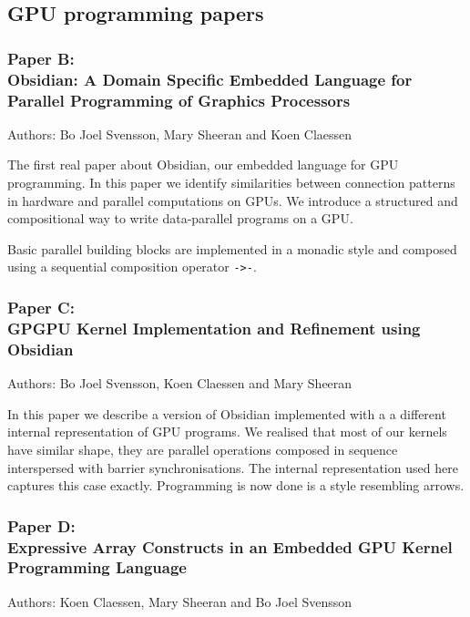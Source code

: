 \documentclass[a4paper]{book}
\newcommand{\paperB}{Paper B}
\newcommand{\paperBTitle}{Obsidian: A Domain Specific Embedded Language for Parallel Programming of Graphics Processors}
\newcommand{\paperC}{Paper C}
\newcommand{\paperCTitle}{GPGPU Kernel Implementation and Refinement using Obsidian}
\newcommand{\paperD}{Paper D}
\newcommand{\paperDTitle}{Expressive Array Constructs in an Embedded GPU Kernel Programming Language}
\begin{document}
\subsection{GPU programming papers} 

\subsubsection{\paperB: \\ \paperBTitle}

Authors: Bo Joel Svensson, Mary Sheeran and Koen Claessen \newline

\vspace{5mm}

The first real paper about Obsidian, our embedded language for GPU 
programming. In this paper we identify similarities between 
connection patterns in hardware and parallel computations on GPUs. 
We introduce a structured and compositional way to write data-parallel 
programs on a GPU.

Basic parallel building blocks are implemented in a monadic style and 
composed using a sequential composition operator {\tt ->-}. 

\subsubsection{\paperC: \\ \paperCTitle}

Authors: Bo Joel Svensson, Koen Claessen and Mary Sheeran \newline

\vspace{5mm}

In this paper we describe a version of Obsidian implemented with a 
a different internal representation of GPU programs. We realised that 
most of our kernels have similar shape, they are parallel operations 
composed in sequence interspersed with barrier synchronisations. The 
internal representation used here captures this case exactly. Programming 
is now done is a style resembling arrows. 


\subsubsection{\paperD: \\ \paperDTitle}

Authors: Koen Claessen, Mary Sheeran and  Bo Joel Svensson \newline
\end{document}
